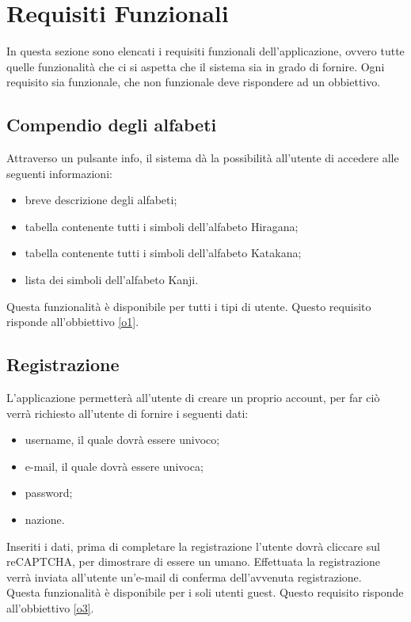 \section{Requisiti Funzionali}
In questa sezione sono elencati i requisiti funzionali dell'applicazione, ovvero tutte quelle funzionalità che ci si aspetta che il sistema sia in grado di fornire. 
Ogni requisito sia funzionale, che non funzionale deve rispondere ad un obbiettivo.

\subsection{Compendio degli alfabeti} \label{req_compendio}
Attraverso un pulsante info, il sistema dà la possibilità all'utente di accedere alle seguenti informazioni:
\begin{itemize}
    \item breve descrizione degli alfabeti;
    \item tabella contenente tutti i simboli dell'alfabeto Hiragana;
    \item tabella contenente tutti i simboli dell'alfabeto Katakana;
    \item lista dei simboli dell'alfabeto Kanji.
\end{itemize}
Questa funzionalità è disponibile per tutti i tipi di utente. Questo requisito risponde all'obbiettivo \ref{o1}.

\subsection{Registrazione} \label{req_registrazione}
L'applicazione permetterà all'utente di creare un proprio account, per far ciò verrà richiesto all'utente di fornire i seguenti dati:
\begin{itemize}
    \item username, il quale dovrà essere univoco;
    \item e-mail, il quale dovrà essere univoca;
    \item password;
    \item nazione.
\end{itemize}
Inseriti i dati, prima di completare la registrazione l'utente dovrà cliccare sul reCAPTCHA, per dimostrare di essere un umano. Effettuata la registrazione verrà inviata all’utente un’e-mail di conferma dell’avvenuta registrazione. \\
Questa funzionalità è disponibile per i soli utenti guest. Questo requisito risponde all'obbiettivo \ref{o3}.

